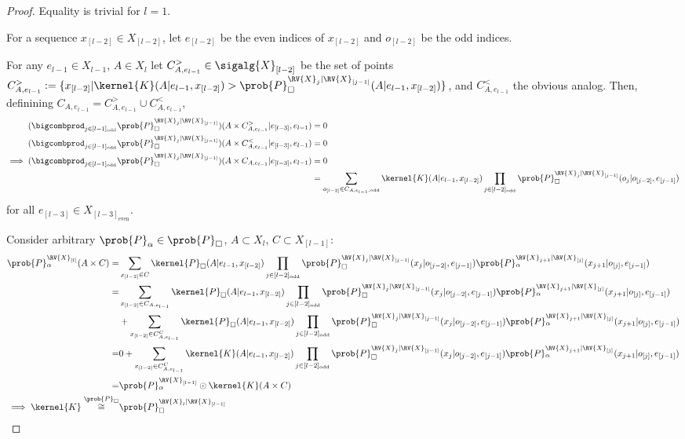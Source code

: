 \begin{proof}
Equality is trivial for $l=1$. 

For a sequence $x_{[l-2]}\in X_{[l-2]}$, let $e_{[l-2]}$ be the even indices of $x_{[l-2]}$ and $o_{[l-2]}$ be the odd indices.

For any $e_{l-1}\in X_{l-1}$, $A\in X_{l}$ let $C^>_{A,e_{l-1}}\in \sigalg{X}_{[l-2]}$ be the set of points $C^>_{A,e_{l-1}}:=\{x_{[l-2]}| \kernel{K}(A|e_{l-1},x_{[l-2]})> \prob{P}_\square^{\RV{X}_{j}|\RV{X}_{[j-1]}}(A|e_{l-1},x_{[l-2]})\}$, and $C^<_{A,e_{l-1}}$ the obvious analog. Then, definining $C_{A,e_{l-1}}=C^>_{A,e_{l-1}}\cup C^<_{A,e_{l-1}}$,
\begin{align}
    (\bigcombprod_{j\in [l-1]_{\mathrm{odd}}} \prob{P}_\square^{\RV{X}_{j}|\RV{X}_{[j-1]}})(A\times C^>_{A,e_{l-1}}|e_{[l-3]},e_{l-1}) &= 0\\
    (\bigcombprod_{j\in [l-1]_{\mathrm{odd}}} \prob{P}_\square^{\RV{X}_{j}|\RV{X}_{[j-1]}})(A\times C^<_{A,e_{l-1}}|e_{[l-3]},e_{l-1}) &= 0\\
    \implies (\bigcombprod_{j\in [l-1]_{\mathrm{odd}}} \prob{P}_\square^{\RV{X}_{j}|\RV{X}_{[j-1]}})(A\times C_{A,e_{l-1}}|e_{[l-3]},e_{l-1}) &= 0\\
    &= \sum_{o_{[l-2]}\in C_{A,e_{l-1},\text{odd}}} \kernel{K}(A|e_{l-1},x_{[l-2]}) \prod_{j\in [l-2]_{\text{odd}}} \prob{P}_\square^{\RV{X}_{j}|\RV{X}_{[j-1]}}(o_{j}|o_{[j-2]},e_{[j-1]})
\end{align}
for all $e_{[l-3]}\in X_{[l-3]_{\text{even}}}$.

Consider arbitrary $\prob{P}_\alpha\in \prob{P}_\square$, $A\subset X_l$, $C\subset X_{[l-1]}$:
\begin{align}
    \prob{P}_\alpha^{\RV{X}_{[l]}} (A\times C) =&  \sum_{x_{[l-2]}\in C} \kernel{P}_\square(A|e_{l-1},x_{[l-2]}) \prod_{j\in [l-2]_{\text{odd}}} \prob{P}_\square^{\RV{X}_{j}|\RV{X}_{[j-1]}}(x_{j}|o_{[j-2]},e_{[j-1]}) \prob{P}_\alpha^{\RV{X}_{j+1}|\RV{X}_{[j]}}(x_{j+1}|o_{[j]},e_{[j-1]})\\
    =& \sum_{x_{[l-2]}\in C_{A,e_{l-1}}} \kernel{P}_\square(A|e_{l-1},x_{[l-2]}) \prod_{j\in [l-2]_{\text{odd}}} \prob{P}_\square^{\RV{X}_{j}|\RV{X}_{[j-1]}}(x_{j}|o_{[j-2]},e_{[j-1]}) \prob{P}_\alpha^{\RV{X}_{j+1}|\RV{X}_{[j]}}(x_{j+1}|o_{[j]},e_{[j-1]}) \\
    &+ \sum_{x_{[l-2]}\in C^C_{A,e_{l-1}}} \kernel{P}_\square(A|e_{l-1},x_{[l-2]}) \prod_{j\in [l-2]_{\text{odd}}} \prob{P}_\square^{\RV{X}_{j}|\RV{X}_{[j-1]}}(x_{j}|o_{[j-2]},e_{[j-1]}) \prob{P}_\alpha^{\RV{X}_{j+1}|\RV{X}_{[j]}}(x_{j+1}|o_{[j]},e_{[j-1]})\\
    =& 0 + \sum_{x_{[l-2]}\in C^C_{A,e_{l-1}}} \kernel{K}(A|e_{l-1},x_{[l-2]}) \prod_{j\in [l-2]_{\text{odd}}} \prob{P}_\square^{\RV{X}_{j}|\RV{X}_{[j-1]}}(x_{j}|o_{[j-2]},e_{[j-1]}) \prob{P}_\alpha^{\RV{X}_{j+1}|\RV{X}_{[j]}}(x_{j+1}|o_{[j]},e_{[j-1]})\\
    =& \prob{P}_\alpha^{\RV{X}_{[l-1]}}\odot \kernel{K} (A\times C)\\
    \implies \kernel{K} \overset{\prob{P}_\square}{\cong}& \prob{P}_\square^{\RV{X}_{l}|\RV{X}_{[l-1]}}
\end{align}
\end{proof}


